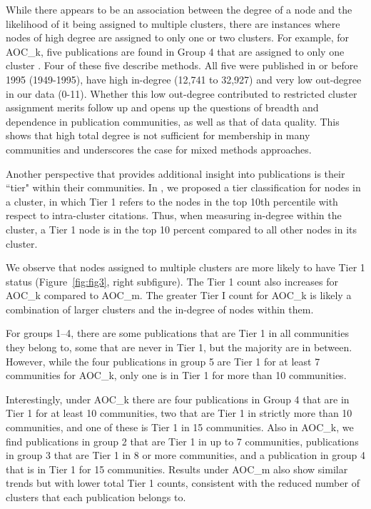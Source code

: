 \documentclass[12pt, oneside]{article}   	%
\begin{document}
{	
While there appears to be an association between the degree of a node and the likelihood of it being assigned to multiple clusters, there are instances where nodes of high degree are assigned to only one or two clusters. 
For example, for AOC\_k, five publications are found in Group 4 that are assigned to only one cluster \citep{arnon1949copper,ellman1961new,friedewald1972estimation,iijima1991helical,raymond1995genepop}. Four of these five describe methods. All five were published in or before 1995 (1949-1995), have high in-degree (12,741 to 32,927) and very low out-degree in our data (0-11). Whether this low out-degree contributed to restricted cluster assignment merits follow up and opens up the questions of breadth and dependence \citep{bu2021multidimensional} in publication communities, as well as that of data quality. This shows that high total degree is not sufficient for membership in many communities and underscores the case for mixed methods approaches.
	
Another perspective that provides additional insight into publications is their ``tier" within their communities. In \cite{Chandrasekharan2021}, we  proposed a tier classification for nodes in a cluster, in which Tier 1 refers to the nodes in the top 10th percentile with respect to intra-cluster citations. Thus, when measuring in-degree within the cluster, a Tier 1 node is in the top 10 percent compared to all other nodes in its cluster. 

We observe that nodes assigned to multiple clusters are more likely to have Tier 1 status (Figure~\ref{fig:fig3}, right subfigure). The Tier 1 count also increases for AOC\_k compared to AOC\_m. The greater Tier I count for AOC\_k is likely a combination of larger clusters and the in-degree of nodes within them.

For groups 1--4, there are some publications that are Tier 1 in all communities they belong to, some that are never in Tier 1, but the majority are in between. 
However, while the four publications in group 5 are Tier 1 for at least 7 communities for AOC\_k, only one is in Tier 1 for more than 10 communities. 

Interestingly, under AOC\_k there are four publications in Group 4 that are in Tier 1 for at least 10 communities, two that are Tier 1 in strictly more than 10 communities, and one of these is Tier 1 in 15 communities. Also in AOC\_k, we find publications in group 2 that are Tier 1 in up to 7 communities, publications in group 3 that are Tier 1 in 8 or more communities, and a publication in group 4 that is in Tier 1 for 15 communities. Results under AOC\_m also show similar trends but with lower total Tier 1 counts, consistent with the reduced number of clusters that each publication belongs to.
	
}
\end{document}
